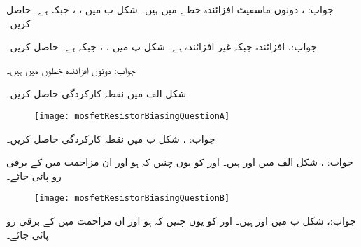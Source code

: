 جواب: ، دونوں ماسفیٹ افزائندہ خطے میں ہیں۔
شکل  ب میں ، ،   جبکہ  ہے۔ حاصل کریں۔

جواب:،  افزائندہ جبکہ  غیر افزائندہ ہے۔
شکل  پ میں ، ،   جبکہ  ہے۔ حاصل کریں۔

جواب: دونوں افزائندہ خطوں میں ہیں۔ 

شکل  الف میں نقطہ کارکردگی حاصل کریں۔
\begin{figure}
\centering
\texttt{[image: mosfetResistorBiasingQuestionA]}
\caption{}
\label{شکل_ماسفیٹ_مزاحمت_سے_مائل_الف}
\end{figure}

جواب: ، 
شکل  ب میں نقطہ کارکردگی حاصل کریں۔

جواب: ، 
شکل  الف میں   اور
 ہیں۔ اور  کو یوں چنیں کہ  ہو اور ان مزاحمت میں  کے   برقی رو پائی جائے۔
\begin{figure}
\centering
\texttt{[image: mosfetResistorBiasingQuestionB]}
\caption{}
\label{شکل_ماسفیٹ_مزاحمت_سے_مائل_ب}
\end{figure}

جواب:، 
شکل  ب میں   اور
 ہیں۔ اور  کو یوں چنیں کہ  ہو اور ان مزاحمت میں  کے   برقی رو پائی جائے۔

